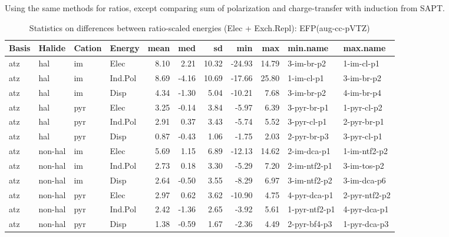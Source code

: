 \documentclass[a4paper]{article}
\begin{document}
Using the same methods for ratios, except comparing sum of polarization and charge-transfer with induction from SAPT.

\begin{table}[ht]
\centering
\begin{tabular}{llllrrrrrll}

  \hline
Basis & Halide & Cation & Energy & mean & med & sd & min & max & min.name & max.name \\ 
 \hline
  atz & hal & im & Elec & 8.10 & 2.21 & 10.32 & -24.93 & 14.79 & 3-im-br-p2 & 1-im-cl-p1 \\ 
  atz & hal & im & Ind.Pol & 8.69 & -4.16 & 10.69 & -17.66 & 25.80 & 1-im-cl-p1 & 3-im-br-p2 \\ 
  atz & hal & im & Disp & 4.34 & -1.30 & 5.04 & -10.21 & 7.68 & 3-im-br-p2 & 4-im-br-p4 \\ 
  atz & hal & pyr & Elec & 3.25 & -0.14 & 3.84 & -5.97 & 6.39 & 3-pyr-br-p1 & 1-pyr-cl-p2 \\ 
  atz & hal & pyr & Ind.Pol & 2.91 & 0.37 & 3.43 & -5.74 & 5.52 & 3-pyr-cl-p1 & 2-pyr-br-p1 \\ 
  atz & hal & pyr & Disp & 0.87 & -0.43 & 1.06 & -1.75 & 2.03 & 2-pyr-br-p3 & 3-pyr-cl-p1 \\ 
  atz & non-hal & im & Elec & 5.69 & 1.15 & 6.89 & -12.13 & 14.62 & 2-im-dca-p1 & 1-im-ntf2-p2 \\ 
  atz & non-hal & im & Ind.Pol & 2.73 & 0.18 & 3.30 & -5.29 & 7.20 & 2-im-ntf2-p1 & 3-im-tos-p2 \\ 
  atz & non-hal & im & Disp & 2.64 & -0.50 & 3.55 & -8.29 & 6.97 & 3-im-ntf2-p2 & 3-im-dca-p6 \\ 
  atz & non-hal & pyr & Elec & 2.97 & 0.62 & 3.62 & -10.90 & 4.75 & 4-pyr-dca-p1 & 2-pyr-ntf2-p2 \\ 
  atz & non-hal & pyr & Ind.Pol & 2.42 & -1.36 & 2.65 & -3.92 & 5.61 & 1-pyr-ntf2-p1 & 4-pyr-dca-p1 \\ 
  atz & non-hal & pyr & Disp & 1.38 & -0.59 & 1.67 & -2.36 & 4.49 & 2-pyr-bf4-p3 & 1-pyr-dca-p3 \\ 
   \hline
\end{tabular}
\caption{Statistics on differences between ratio-scaled energies (Elec + Exch.Repl): EFP(aug-cc-pVTZ)}
\end{table}
\end{document}
